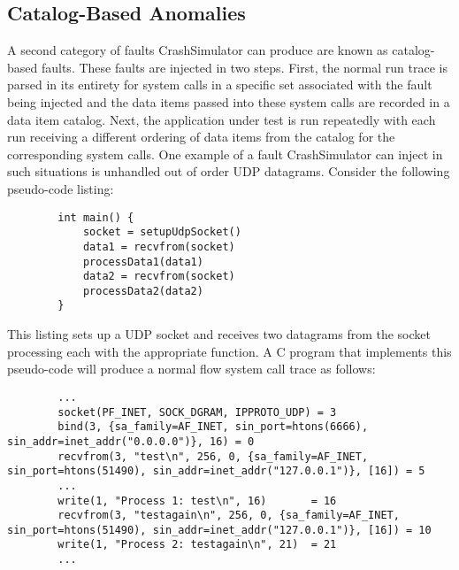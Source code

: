     \subsection{Catalog-Based Anomalies}

    A second category of faults CrashSimulator can produce are known as catalog-based
    faults. These faults are injected in two steps. First, the normal run trace is parsed in its entirety for system
    calls in a specific set associated with the fault being injected and the data items passed into these system calls
    are recorded in a data item catalog. Next, the application under test is run repeatedly with each run receiving a
    different ordering of data items from the catalog for the corresponding system calls. One example of a fault
    CrashSimulator can inject in such situations is unhandled out of order UDP datagrams. Consider the following
    pseudo-code listing:

    \begin{verbatim}
        int main() {
            socket = setupUdpSocket()
            data1 = recvfrom(socket)
            processData1(data1)
            data2 = recvfrom(socket)
            processData2(data2)
        }
    \end{verbatim}

    This listing sets up a UDP socket and receives two datagrams from the socket processing each with the appropriate
    function. A C program that implements this pseudo-code will produce a normal flow system call trace as follows:

    \begin{verbatim}
        ...
        socket(PF_INET, SOCK_DGRAM, IPPROTO_UDP) = 3
        bind(3, {sa_family=AF_INET, sin_port=htons(6666), sin_addr=inet_addr("0.0.0.0")}, 16) = 0
        recvfrom(3, "test\n", 256, 0, {sa_family=AF_INET, sin_port=htons(51490), sin_addr=inet_addr("127.0.0.1")}, [16]) = 5
        ...
        write(1, "Process 1: test\n", 16)       = 16
        recvfrom(3, "testagain\n", 256, 0, {sa_family=AF_INET, sin_port=htons(51490), sin_addr=inet_addr("127.0.0.1")}, [16]) = 10
        write(1, "Process 2: testagain\n", 21)  = 21
        ...
    \end{verbatim}

